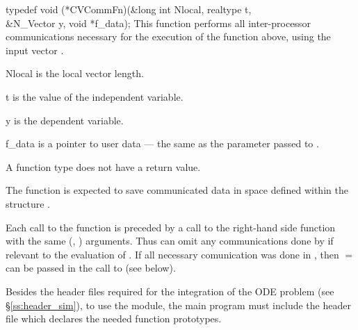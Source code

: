 {
  typedef void (*CVCommFn)(&long int Nlocal, realtype t,  \\
                           &N\_Vector y, void *f\_data);
}
{
  This function performs all inter-processor communications necessary 
  for the execution of the  function above, using the input vector .
}
{
  \begin{args}[Nlocal]
  \item[Nlocal] 
    is the local vector length.
  \item[t]
    is the value of the independent variable.
  \item[y]
    is the dependent variable. 
  \item[f\_data]
    is a pointer to user data --- the same as the       
    parameter passed to .  
  \end{args}
}
{
  A  function type does not have a return value.
}
{
  The  function is expected to save communicated data in space defined
  within the structure . 

  Each call to the  function is preceded by a call to the right-hand side
  function  with the same (, ) arguments.  Thus  can omit 
  any communications done by  if relevant to the evaluation of .
  If all necessary comunication was done in , then  $=$ 
  can be passed in the call to  (see below).
}

Besides the header files required for the integration of the ODE problem
(see \S\ref{ss:header_sim}),  to use the {\cvbbdpre} module, the main program 
must include the header file  which declares the needed
function prototypes.

